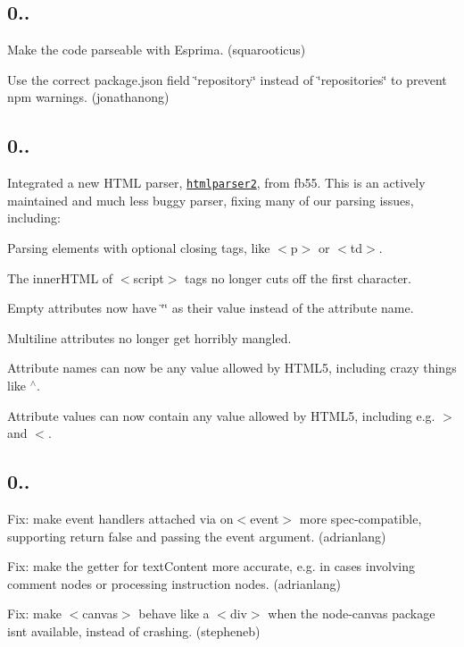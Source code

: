 \subsection*{0..}


\begin{DoxyItemize}
\item Make the code parseable with Esprima. (squarooticus)
\item Use the correct {\ttfamily package.\+json} field {\ttfamily \char`\"{}repository\char`\"{}} instead of {\ttfamily \char`\"{}repositories\char`\"{}} to prevent npm warnings. (jonathanong)
\end{DoxyItemize}

\subsection*{0..}

Integrated a new H\+T\+ML parser, \href{https://npmjs.org/package/htmlparser2}{\tt htmlparser2}, from fb55. This is an actively maintained and much less buggy parser, fixing many of our parsing issues, including\+:


\begin{DoxyItemize}
\item Parsing elements with optional closing tags, like {\ttfamily $<$p$>$} or {\ttfamily $<$td$>$}.
\item The {\ttfamily inner\+H\+T\+ML} of {\ttfamily $<$script$>$} tags no longer cuts off the first character.
\item Empty attributes now have {\ttfamily \char`\"{}\char`\"{}} as their value instead of the attribute name.
\item Multiline attributes no longer get horribly mangled.
\item Attribute names can now be any value allowed by H\+T\+M\+L5, including crazy things like {\ttfamily $^\wedge$}.
\item Attribute values can now contain any value allowed by H\+T\+M\+L5, including e.\+g. {\ttfamily $>$} and {\ttfamily $<$}.
\end{DoxyItemize}

\subsection*{0..}


\begin{DoxyItemize}
\item Fix\+: make event handlers attached via {\ttfamily on$<$event$>$} more spec-\/compatible, supporting {\ttfamily return false} and passing the {\ttfamily event} argument. (adrianlang)
\item Fix\+: make the getter for {\ttfamily text\+Content} more accurate, e.\+g. in cases involving comment nodes or processing instruction nodes. (adrianlang)
\item Fix\+: make {\ttfamily $<$canvas$>$} behave like a {\ttfamily $<$div$>$} when the {\ttfamily node-\/canvas} package isn\textquotesingle{}t available, instead of crashing. (stepheneb)
\end{DoxyItemize}

